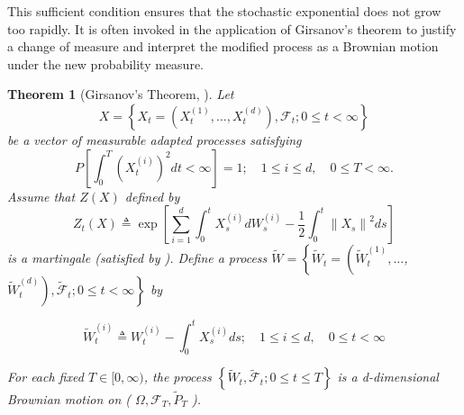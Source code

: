 \documentclass[11pt, twoside]{report}
\newtheorem{theorem}{Theorem}[section]
\begin{document}
This sufficient condition ensures that the stochastic exponential does not grow too rapidly. It is often invoked in the application of Girsanov's theorem to justify a change of measure and interpret the modified process as a Brownian motion under the new probability measure.

\begin{theorem}[Girsanov's Theorem, \texorpdfstring{\cite[Theorem~5.1]{Karatzas1991-xr}}{}]
Let $$X=\left\{X_t=\left(X_t^{(1)}, \ldots, X_t^{(d)}\right), \mathcal{F}_t ; 0 \leq t<\infty\right\}$$ be a vector of measurable adapted processes satisfying
$$
P\left[\int_0^T\left(X_t^{(i)}\right)^2 d t<\infty\right]=1 ; \quad 1 \leq i \leq d, \quad 0 \leq T<\infty.
$$
Assume that $Z(X)$ defined by 
$$
Z_t(X) \triangleq \exp \left[\sum_{i=1}^d \int_0^t X_s^{(i)} d W_s^{(i)}-\frac{1}{2} \int_0^t\left\|X_s\right\|^2 d s\right]
$$
is a martingale (satisfied by \cite[Corollary 5.13 of Novikov Condition]{Karatzas1991-xr}). Define a process $\tilde{W}=\left\{\tilde{W}_t=\left(\tilde{W}_t^{(1)}, \ldots\right.\right.$, $\left.\left.\tilde{W}_t^{(d)}\right), \tilde{\mathcal{F}}_t ; 0 \leq t<\infty\right\}$ by

$$
\tilde{W}_t^{(i)} \triangleq W_t^{(i)}-\int_0^t X_s^{(i)} d s ; \quad 1 \leq i \leq d, \quad 0 \leq t<\infty
$$


For each fixed $T \in[0, \infty)$, the process $\left\{\tilde{W}_t, \tilde{\mathcal{F}}_t ; 0 \leq t \leq T\right\}$ is a d-dimensional Brownian motion on ( $\Omega, \mathcal{F}_T, \widetilde{P}_T$ ).
\end{theorem}

\end{document}
